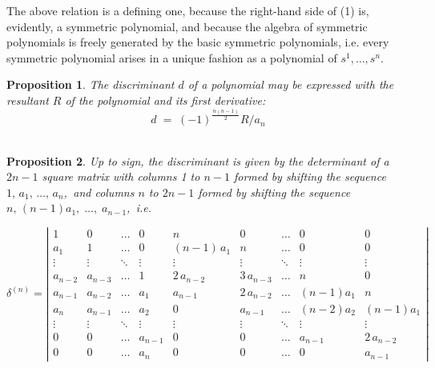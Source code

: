 \documentclass[12pt]{article}
\newcommand{\dn}{\delta^{(n)}}
\newtheorem{proposition}{Proposition}
\begin{document}
The above relation is a defining one, because the right-hand side of
(1) is, evidently, a symmetric polynomial, and because the algebra of
symmetric polynomials is freely generated by the basic symmetric
polynomials, i.e. every symmetric polynomial arises in a unique
fashion as a polynomial of $s^1,\ldots,s^n$.

\begin{proposition}
The discriminant $d$ of a polynomial may be expressed with the resultant $R$ of the polynomial and its first derivative:
$$d \;=\; (-1)^{\frac{n(n-1)}{2}}R/a_n$$\\
\end{proposition}

\begin{proposition}
  Up to sign, the discriminant is given by the determinant of a
  $2n\!-\!1$ square matrix with columns 1 to $n\!-\!1$ formed by shifting the
  sequence \,$1,\,a_1,\,\ldots,\,a_n$,\, and columns $n$ to $2n\!-\!1$ formed by
  shifting the sequence\, $n,\,(n\!-\!1)a_1,\;\ldots,\;a_{n-1}$,\, i.e.
 
  {\small
  \begin{equation}
    \label{eq:detform}
    \dn = \left | 
      \begin{array}{ccccccccc}
        1   & 0   & \ldots & 0 & n   & 0   & \ldots & 0 &0\\
        a_1 & 1   & \ldots & 0 & (n-1)\,a_1 & n   & \ldots & 0&0 \\
        \vdots & \vdots & \ddots & \vdots & \vdots & \vdots & \ddots &
        \vdots & \vdots\\ 
        a_{n-2} & a_{n-3} & \ldots & 1 & 2\,a_{n-2} & 3\,a_{n-3} &
        \ldots & n & 0\\   
        a_{n-1}  & a_{n-2} & \ldots & a_1 & a_{n-1} & 2\,a_{n-2} &
        \ldots & (n-1) a_1 & n\\
        a_{n}  & a_{n-1} & \ldots & a_2  & 0 & a_{n-1} & \ldots &
        (n-2) a_2  & (n-1) a_1\\
        \vdots  & \vdots & \ddots & \vdots & \vdots & \vdots & \ddots
        & \vdots & \vdots\\
        0 & 0  & \ldots & a_{n-1}  &0  &0
        &\ldots & a_{n-1}& 2\,a_{n-2} \\
        0 & 0 &  \ldots  & a_n & 0 & 0 &\ldots &0 & a_{n-1} 
      \end{array}\right|    
  \end{equation}}
\end{proposition}
\end{document}
